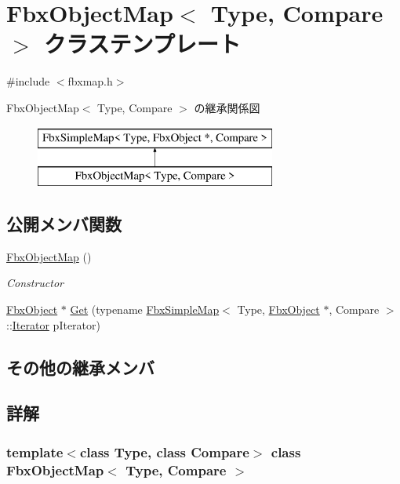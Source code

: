 \hypertarget{class_fbx_object_map}{}\section{Fbx\+Object\+Map$<$ Type, Compare $>$ クラステンプレート}
\label{class_fbx_object_map}


{\ttfamily \#include $<$fbxmap.\+h$>$}

Fbx\+Object\+Map$<$ Type, Compare $>$ の継承関係図\begin{figure}[H]
\begin{center}
\leavevmode
\includegraphics[height=2.000000cm]{class_fbx_object_map}
\end{center}
\end{figure}
\subsection*{公開メンバ関数}
\begin{DoxyCompactItemize}
\item 
\hyperlink{class_fbx_object_map_a6567cb563c8c14bf79104468c8622d44}{Fbx\+Object\+Map} ()
\begin{DoxyCompactList}\small\item\em Constructor \end{DoxyCompactList}\item 
\hyperlink{class_fbx_object}{Fbx\+Object} $\ast$ \hyperlink{class_fbx_object_map_a0f91929931a5379c7983812644ff706a}{Get} (typename \hyperlink{class_fbx_simple_map}{Fbx\+Simple\+Map}$<$ Type, \hyperlink{class_fbx_object}{Fbx\+Object} $\ast$, Compare $>$\+::\hyperlink{class_fbx_simple_map_aaa589eb5e1ccdd11dffd018f3212e13e}{Iterator} p\+Iterator)
\end{DoxyCompactItemize}
\subsection*{その他の継承メンバ}


\subsection{詳解}
\subsubsection*{template$<$class Type, class Compare$>$\newline
class Fbx\+Object\+Map$<$ Type, Compare $>$}


